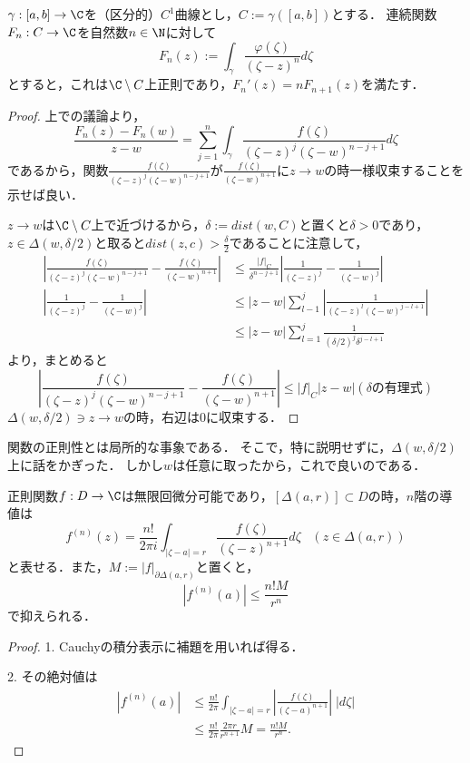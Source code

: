 \documentclass[uplatex, dvipdfmx]{jsreport}
\begin{document}
\begin{lemma}
    $\gamma:[a,b]\to\C$を（区分的）$C^1$曲線とし，$C:=\gamma([a,b])$とする．
    連続関数$F_n:C\to\C$を自然数$n\in\N$に対して
    \[ F_n(z):=\int_\gamma\frac{\varphi(\zeta)}{(\zeta-z)^n}d\zeta \]
    とすると，これは$\C\setminus C$上正則であり，$F_n'(z)=nF_{n+1}(z)$を満たす．
\end{lemma}
\begin{proof}
    上での議論より，
    \[ \frac{F_n(z)-F_n(w)}{z-w}=\sum^n_{j=1}\int_\gamma\frac{f(\zeta)}{(\zeta-z)^j(\zeta-w)^{n-j+1}}d\zeta \]
    であるから，関数$\frac{f(\zeta)}{(\zeta-z)^j(\zeta-w)^{n-j+1}}$が$\frac{f(\zeta)}{(\zeta-w)^{n+1}}$に$z\to w$の時一様収束することを示せば良い．

    $z\to w$は$\C\setminus C$上で近づけるから，$\delta:=dist(w,C)$と置くと$\delta>0$であり，$z\in\Delta(w,\delta/2)$と取ると$dist(z,c)>\frac{\delta}{2}$であることに注意して，
    \begin{align*}
        \left|\frac{f(\zeta)}{(\zeta-z)^j(\zeta-w)^{n-j+1}}-\frac{f(\zeta)}{(\zeta-w)^{n+1}}\right|&\le \frac{|f|_C}{\delta^{n-j+1}}\left|\frac{1}{(\zeta-z)^j}-\frac{1}{(\zeta-w)^j}\right|\\
        \left|\frac{1}{(\zeta-z)^j}-\frac{1}{(\zeta-w)^j}\right|&\le |z-w|\sum^j_{l-1}\left|\frac{1}{(\zeta-z)^l(\zeta-w)^{j-l+1}}\right|\\
        &\le |z-w|\sum^j_{l=1}\frac{1}{(\delta/2)^j\delta^{j-l+1}}
    \end{align*}
    より，まとめると
    \[ \left|\frac{f(\zeta)}{(\zeta-z)^j(\zeta-w)^{n-j+1}}-\frac{f(\zeta)}{(\zeta-w)^{n+1}}\right|\le|f|_C|z-w|(\delta の有理式) \]
    $\Delta(w,\delta/2)\ni z\to w$の時，右辺は$0$に収束する．
\end{proof}
\begin{remarks}
    関数の正則性とは局所的な事象である．
    そこで，特に説明せずに，$\Delta(w,\delta/2)$上に話をかぎった．
    しかし$w$は任意に取ったから，これで良いのである．
\end{remarks}

\begin{theorem}[Cauchyの評価]\label{thm-Cauchy's-evaluation}
    正則関数$f:D\to\C$は無限回微分可能であり，$[\Delta(a,r)]\subset D$の時，$n$階の導値は
    \[ f^{(n)}(z)=\frac{n!}{2\pi i}\int_{|\zeta-a|=r}\frac{f(\zeta)}{(\zeta-z)^{n+1}}d\zeta\;\;\;(z\in\Delta(a,r)) \]
    と表せる．また，$M:=|f|_{\partial\Delta(a,r)}$と置くと，
    \[ |f^{(n)}(a)|\le \frac{n!M}{r^n} \]
    で抑えられる．
\end{theorem}
\begin{proof}
    1. Cauchyの積分表示に補題を用いれば得る．

    2. その絶対値は
    \begin{align*}
        |f^{(n)}(a)|&\le\frac{n!}{2\pi}\int_{|\zeta-a|=r}\left|\frac{f(\zeta)}{(\zeta-a)^{n+1}}\right|\;|d\zeta|\\
        &\le\frac{n!}{2\pi}\frac{2\pi r}{r^{n+1}}M=\frac{n!M}{r^n}.
    \end{align*}
\end{proof}
\end{document}
